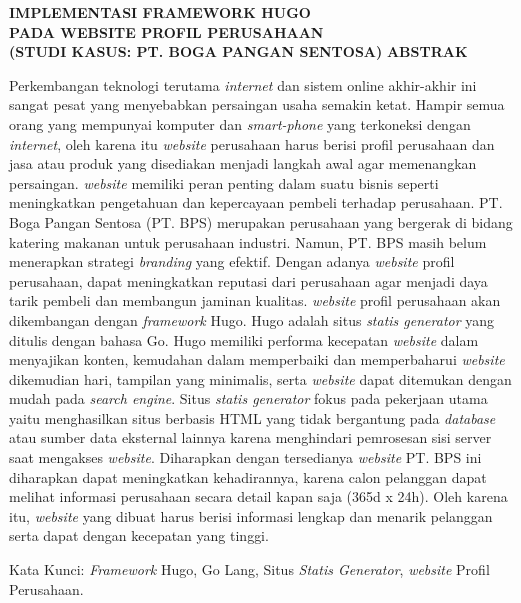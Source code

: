 \begin{center}
    \textbf{IMPLEMENTASI FRAMEWORK HUGO \\
    PADA WEBSITE PROFIL PERUSAHAAN \\
     (STUDI KASUS: PT. BOGA PANGAN SENTOSA)}
    \textbf{ABSTRAK}
\end{center}

Perkembangan teknologi terutama \emph{internet} dan sistem online akhir-akhir ini sangat pesat 
yang menyebabkan persaingan usaha semakin ketat. Hampir semua orang yang mempunyai komputer 
dan \emph{smart-phone} yang terkoneksi dengan \emph{internet}, oleh karena itu \emph{website} perusahaan harus berisi 
profil perusahaan dan jasa atau produk yang disediakan menjadi langkah awal agar memenangkan persaingan. 
\emph{website} memiliki peran penting dalam suatu bisnis seperti meningkatkan pengetahuan dan kepercayaan pembeli 
terhadap perusahaan. PT. Boga Pangan Sentosa (PT. BPS) merupakan perusahaan yang bergerak di bidang katering 
makanan untuk perusahaan industri. Namun, PT. BPS masih belum menerapkan strategi \emph{branding} yang efektif. 
Dengan adanya \emph{website} profil perusahaan, dapat meningkatkan reputasi dari perusahaan agar menjadi daya tarik 
pembeli dan membangun jaminan kualitas. \emph{website} profil perusahaan akan dikembangan dengan \emph{framework} Hugo. 
Hugo adalah situs \emph{statis generator} yang ditulis dengan bahasa Go. Hugo memiliki performa kecepatan \emph{website} 
dalam menyajikan konten, kemudahan dalam memperbaiki dan memperbaharui \emph{website} dikemudian hari, tampilan yang 
minimalis, serta \emph{website} dapat ditemukan dengan mudah pada \emph{search engine}.  Situs \emph{statis generator} 
fokus pada 
pekerjaan utama yaitu menghasilkan situs berbasis HTML yang tidak bergantung pada \emph{database} atau sumber data 
eksternal lainnya karena menghindari pemrosesan sisi server saat mengakses \emph{website}. 
Diharapkan dengan tersedianya \emph{website} PT. BPS ini diharapkan dapat meningkatkan kehadirannya, 
karena calon pelanggan dapat melihat informasi perusahaan secara detail kapan saja (365d x 24h). 
Oleh karena itu, \emph{website} yang dibuat harus berisi informasi lengkap dan menarik pelanggan serta dapat 
dengan kecepatan yang tinggi. 

\noindent Kata Kunci: \emph{Framework} Hugo, Go Lang, Situs \emph{Statis Generator}, \emph{website} Profil Perusahaan.